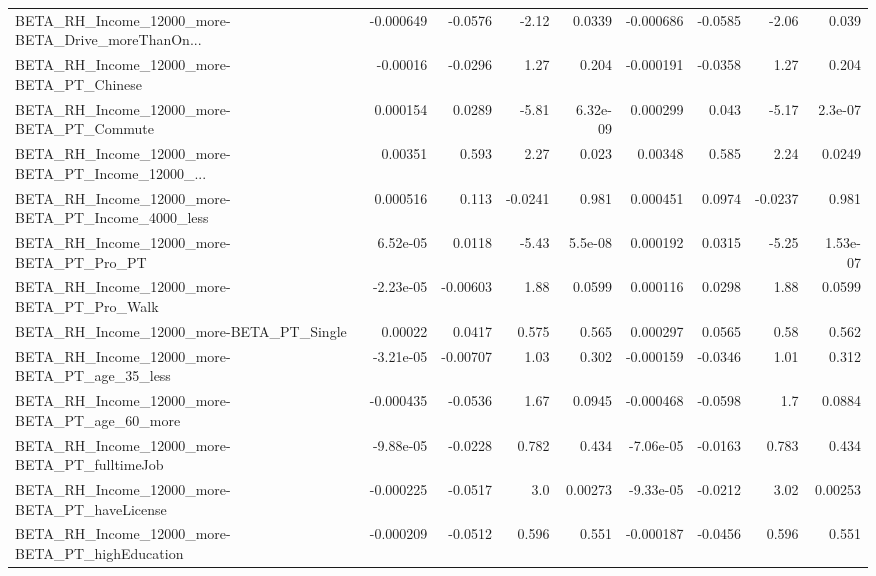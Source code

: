 \begin{tabular}{lrrrrrrrr}
BETA\_RH\_Income\_12000\_more-BETA\_Drive\_moreThanOn... &   -0.000649 &      -0.0576 &     -2.12 &   0.0339 &  -0.000686 &     -0.0585 &        -2.06 &         0.039 \\
BETA\_RH\_Income\_12000\_more-BETA\_PT\_Chinese          &    -0.00016 &      -0.0296 &      1.27 &    0.204 &  -0.000191 &     -0.0358 &         1.27 &         0.204 \\
BETA\_RH\_Income\_12000\_more-BETA\_PT\_Commute          &    0.000154 &       0.0289 &     -5.81 & 6.32e-09 &   0.000299 &       0.043 &        -5.17 &       2.3e-07 \\
BETA\_RH\_Income\_12000\_more-BETA\_PT\_Income\_12000\_... &     0.00351 &        0.593 &      2.27 &    0.023 &    0.00348 &       0.585 &         2.24 &        0.0249 \\
BETA\_RH\_Income\_12000\_more-BETA\_PT\_Income\_4000\_less &    0.000516 &        0.113 &   -0.0241 &    0.981 &   0.000451 &      0.0974 &      -0.0237 &         0.981 \\
BETA\_RH\_Income\_12000\_more-BETA\_PT\_Pro\_PT           &    6.52e-05 &       0.0118 &     -5.43 &  5.5e-08 &   0.000192 &      0.0315 &        -5.25 &      1.53e-07 \\
BETA\_RH\_Income\_12000\_more-BETA\_PT\_Pro\_Walk         &   -2.23e-05 &     -0.00603 &      1.88 &   0.0599 &   0.000116 &      0.0298 &         1.88 &        0.0599 \\
BETA\_RH\_Income\_12000\_more-BETA\_PT\_Single           &     0.00022 &       0.0417 &     0.575 &    0.565 &   0.000297 &      0.0565 &         0.58 &         0.562 \\
BETA\_RH\_Income\_12000\_more-BETA\_PT\_age\_35\_less      &   -3.21e-05 &     -0.00707 &      1.03 &    0.302 &  -0.000159 &     -0.0346 &         1.01 &         0.312 \\
BETA\_RH\_Income\_12000\_more-BETA\_PT\_age\_60\_more      &   -0.000435 &      -0.0536 &      1.67 &   0.0945 &  -0.000468 &     -0.0598 &          1.7 &        0.0884 \\
BETA\_RH\_Income\_12000\_more-BETA\_PT\_fulltimeJob      &   -9.88e-05 &      -0.0228 &     0.782 &    0.434 &  -7.06e-05 &     -0.0163 &        0.783 &         0.434 \\
BETA\_RH\_Income\_12000\_more-BETA\_PT\_haveLicense      &   -0.000225 &      -0.0517 &       3.0 &  0.00273 &  -9.33e-05 &     -0.0212 &         3.02 &       0.00253 \\
BETA\_RH\_Income\_12000\_more-BETA\_PT\_highEducation    &   -0.000209 &      -0.0512 &     0.596 &    0.551 &  -0.000187 &     -0.0456 &        0.596 &         0.551 \\

\end{tabular}

